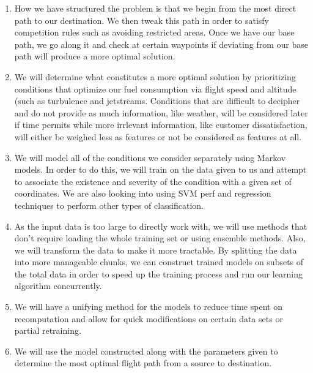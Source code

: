 \documentclass{article}[9pt]
\begin{document}
\begin{enumerate}
	\item How we have structured the problem is that we begin from the most direct path to our destination. We then tweak this path in order to satisfy competition rules such as avoiding restricted areas. Once we have our base path, we go along it and check at certain waypoints if deviating from our base path will produce a more optimal solution. 
	\item We will determine what constitutes a more optimal solution by prioritizing conditions that optimize our fuel consumption via flight speed and altitude (such as turbulence and jetstreams. Conditions that are difficult to decipher and do not provide as much information, like weather, will be considered later if time permits while more irrlevant information, like customer dissatisfaction, will either be weighed less as features or not be considered as features at all.
	\item We will model all of the conditions we consider separately using Markov models. In order to do this, we will train on the data given to us and attempt to associate the existence and severity of the condition with a given set of coordinates. We are also looking into using SVM perf and regression techniques to perform other types of classification.
	\item As the input data is too large to directly work with, we will use methods that don't require loading the whole training set or using ensemble methods. Also, we will transform the data to make it more tractable. By splitting the data into more manageable chunks, we can construct trained models on subsets of the total data in order to speed up the training process and run our learning algorithm concurrently.
	\item We will have a unifying method for the models to reduce time spent on recomputation and allow for quick modifications on certain data sets or partial retraining.
	\item We will use the model constructed along with the parameters given to determine the most optimal flight path from a source to destination.
\end{enumerate}
\end{document}

